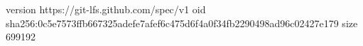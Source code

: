 version https://git-lfs.github.com/spec/v1
oid sha256:0c5e7573ffb667325adefe7afef6c475d6f4a0f34fb2290498ad96c02427e179
size 699192
